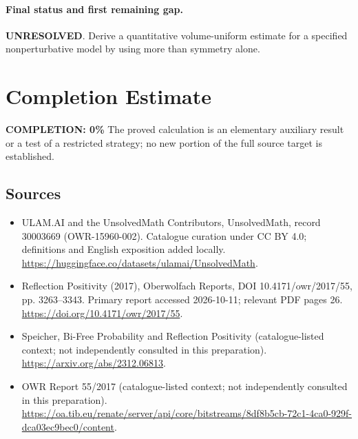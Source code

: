 \documentclass[11pt]{article}
\begin{document}
\paragraph{Final status and first remaining gap.}
\textbf{UNRESOLVED}. Derive a quantitative volume-uniform estimate for a specified nonperturbative model by using more than symmetry alone.

\section{Completion Estimate}
\noindent\textbf{COMPLETION: 0\%}
The proved calculation is an elementary auxiliary result or a test of a restricted strategy; no new portion of the full source target is established.

\subsection{Sources}
\begin{itemize}
\item[\hypertarget{source:30003669:1}{S1}] ULAM.AI and the UnsolvedMath Contributors, UnsolvedMath, record 30003669 (OWR-15960-002). Catalogue curation under CC BY 4.0; definitions and English exposition added locally.
\url{https://huggingface.co/datasets/ulamai/UnsolvedMath}.
\item[\hypertarget{source:30003669:2}{S2}] Reflection Positivity (2017), Oberwolfach Reports, DOI 10.4171/owr/2017/55, pp. 3263--3343. Primary report accessed 2026-10-11; relevant PDF pages 26.
\url{https://doi.org/10.4171/owr/2017/55}.
\item[\hypertarget{source:30003669:3}{S3}] Speicher, Bi-Free Probability and Reflection Positivity (catalogue-listed context; not independently consulted in this preparation).
\url{https://arxiv.org/abs/2312.06813}.
\item[\hypertarget{source:30003669:4}{S4}] OWR Report 55/2017 (catalogue-listed context; not independently consulted in this preparation).
\url{https://oa.tib.eu/renate/server/api/core/bitstreams/8df8b5cb-72c1-4ca0-929f-dca03ec9bec0/content}.
\end{itemize}
\label{end:30003669}
\end{document}
